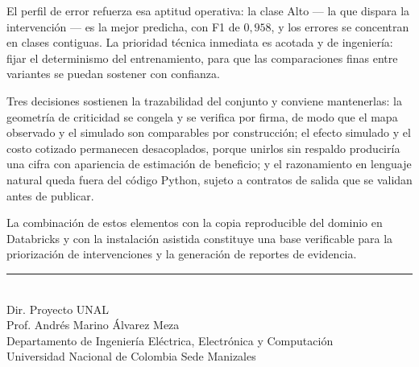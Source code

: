 \documentclass[11pt,a4paper]{article}
\begin{document}
\begin{bloquenuevo}
El perfil de error refuerza esa aptitud operativa: la clase Alto --- la que dispara la
intervención --- es la mejor predicha, con F1 de $0{,}958$, y los errores se concentran en
clases contiguas. La prioridad técnica inmediata es acotada y de ingeniería: fijar el
determinismo del entrenamiento, para que las comparaciones finas entre variantes se puedan
sostener con confianza.
\end{bloquenuevo}

Tres decisiones sostienen la trazabilidad del conjunto y conviene mantenerlas: la geometría de
criticidad se congela y se verifica por firma, de modo que el mapa observado y el simulado son
comparables por construcción; el efecto simulado y el costo cotizado permanecen desacoplados,
porque unirlos sin respaldo produciría una cifra con apariencia de estimación de beneficio; y el
razonamiento en lenguaje natural queda fuera del código Python, sujeto a contratos de salida que
se validan antes de publicar.

La combinación de estos elementos con la copia reproducible del dominio en Databricks y con la
instalación asistida constituye una base verificable para la priorización de intervenciones y la
generación de reportes de evidencia.

\vspace{22mm}

\begin{flushright}
\begin{minipage}{9.5cm}
\raggedleft
\rule{7cm}{0.4pt}\\[2pt]
Dir. Proyecto UNAL\\
Prof. Andrés Marino Álvarez Meza\\
\footnotesize Departamento de Ingeniería Eléctrica, Electrónica y Computación\\
Universidad Nacional de Colombia Sede Manizales
\end{minipage}
\end{flushright}
\end{document}
